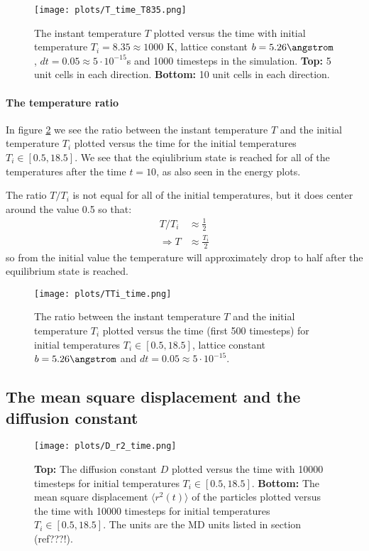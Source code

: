 \documentclass[11pt,a4wide]{article}
\begin{document}
\begin{figure}[htp]
\centering
\texttt{[image: plots/T\_time\_T835.png]}
\caption{The instant temperature $T$ plotted versus the time with initial temperature $T_i = 8.35 \approx 1000$ K, lattice constant $b=5.26 \angstrom$, $dt=0.05\approx  5\cdot 10^{-15}$s and 1000 timesteps in the simulation. \textbf{Top:} 5 unit cells in each direction. \textbf{Bottom:} 10 unit cells in each direction.}
\label{fig: T_time2}
\end{figure}

\paragraph{The temperature ratio}

In figure \ref{fig: TTi_time} we see the ratio between the instant temperature $T$ and the initial temperature $T_i$ plotted versus the time for the initial temperatures $T_i \in [0.5, 18.5]$. We see that the eqiulibrium state is reached for all of the temperatures after the time $t=10$, as also seen in the energy plots. 

The ratio $T/T_i$ is not equal for all of the initial temperatures, but it does center around the value 0.5 so that:
\begin{align*}
T/T_i &\approx \frac{1}{2} \\
\Rightarrow T &\approx \frac{T_i }{2} 
\end{align*}
so from the initial value the temperature will approximately drop to half after the equilibrium state is reached. 

\begin{figure}[htp]
\centering
\texttt{[image: plots/TTi\_time.png]}
\caption{The ratio between the instant temperature $T$ and the initial temperature $T_i$ plotted versus the time (first 500 timesteps) for initial temperatures $T_i \in [0.5, 18.5]$, lattice constant $b=5.26 \angstrom$ and $dt=0.05\approx  5\cdot 10^{-15}$.}
\label{fig: TTi_time}
\end{figure}

\subsection{The mean square displacement and the diffusion constant}

\begin{figure}[htp]
\centering
\texttt{[image: plots/D\_r2\_time.png]}
\caption{\textbf{Top:} The diffusion constant $D$ plotted versus the time with 10000 timesteps for initial temperatures $T_i \in [0.5, 18.5]$. \textbf{Bottom:} The mean square displacement $\langle r^2(t) \rangle$ of the particles plotted versus the time with 10000 timesteps for initial temperatures $T_i \in [0.5, 18.5]$. The units are the MD units listed in section (ref???!).}
\label{fig: D_r2_time}
\end{figure}
\end{document}
